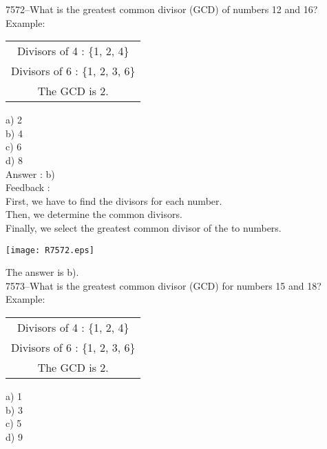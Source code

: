 \documentclass[letterpaper, 12pt]{article}
\begin{document}
7572--What is the greatest common divisor (GCD) of numbers 12 and 16?\\
Example:\\
\begin{center}
\begin{tabular}{|c|}
\hline
Divisors of 4 : \{1, 2, 4\}\\
Divisors of 6 : \{1, 2, 3, 6\}\\
The GCD  is 2.\\
\hline
\end{tabular}
\end{center}

a) 2\\
b) 4\\
c) 6\\
d) 8\\

Answer : b)\\

Feedback :\\
First, we have to find the divisors for each number.\\
Then, we determine the common divisors.\\
Finally, we select the greatest common divisor of the to numbers.\\
\begin{center}
\texttt{[image: R7572.eps]}\\
\end{center}
The answer is b).\\




7573--What is the greatest common divisor (GCD) for numbers 15 and 18?\\
Example:\\
\begin{center}
\begin{tabular}{|c|}
\hline
Divisors of 4 : \{1, 2, 4\}\\
Divisors of 6 : \{1, 2, 3, 6\}\\
The GCD is 2.\\
\hline
\end{tabular}
\end{center}

a) 1\\
b) 3\\
c) 5\\
d) 9\\
\end{document}
